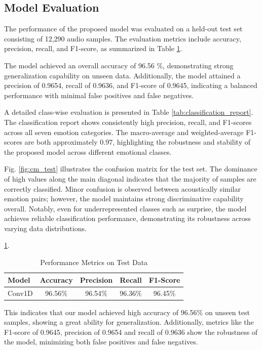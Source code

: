 \documentclass[iicol,sn-mathphys-num]{sn-jnl}%
\theoremstyle{thmstyleone}%
\theoremstyle{thmstyletwo}%
\theoremstyle{thmstylethree}%
\begin{document}
\subsection{Model Evaluation}\label{subsec4.2}
The performance of the proposed model was evaluated on a held-out test set consisting of 12,290 audio samples. The evaluation metrics include accuracy, precision, recall, and F1-score, as summarized in Table \ref{tab:model_performance}.

The model achieved an overall accuracy of 96.56 \%, demonstrating strong generalization capability on unseen data. Additionally, the model attained a precision of 0.9654, recall of 0.9636, and F1-score of 0.9645, indicating a balanced performance with minimal false positives and false negatives.

A detailed class-wise evaluation is presented in Table \ref{tab:classification_report}. The classification report shows consistently high precision, recall, and F1-scores across all seven emotion categories. The macro-average and weighted-average F1-scores are both approximately 0.97, highlighting the robustness and stability of the proposed model across different emotional classes.

Fig. \ref{fig:cm_test} illustrates the confusion matrix for the test set. The dominance of high values along the main diagonal indicates that the majority of samples are correctly classified. Minor confusion is observed between acoustically similar emotion pairs; however, the model maintains strong discriminative capability overall. Notably, even for underrepresented classes such as surprise, the model achieves reliable classification performance, demonstrating its robustness across varying data distributions.

\ref{tab:model_performance}.

\begin{table}[h]
\caption{Performance Metrics on Test Data}\label{tab:model_performance}%
\centering
\normalsize
\begin{tabular}{@{}lcccc@{}} 
\toprule
\textbf{Model} & \textbf{Accuracy} & \textbf{Precision} & \textbf{Recall} & \textbf{F1-Score} \\
\midrule
Conv1D & 96.56\% & 96.54\% & 96.36\% & 96.45\% \\
\bottomrule
\end{tabular}
\end{table}
\iffalse
This indicates that our model achieved high accuracy of 96.56\% on unseen test samples, showing a great ability for generalization. Additionally, metrics like the F1-score of 0.9645, precision of 0.9654 and recall of 0.9636 show the robustness of the model, minimizing both false positives and false negatives.
\end{document}
